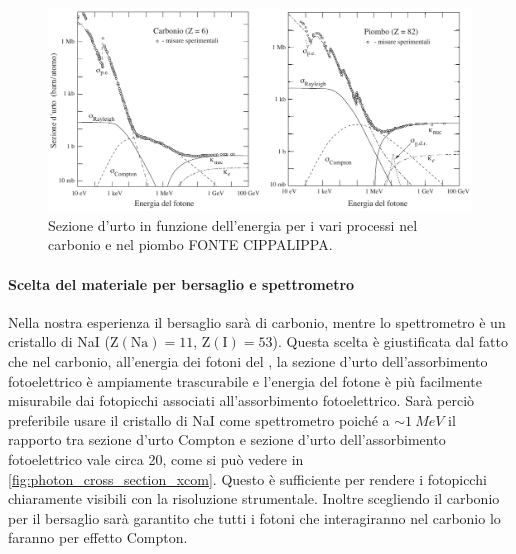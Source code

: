   \begin{figure}[h]
 	\centering
 	\includegraphics[width=\textwidth]{photon-matter-interaction}
 	\caption{\label{fig:photon_cross_section_pdg}Sezione d'urto in funzione dell'energia per i vari processi nel carbonio e nel piombo FONTE CIPPALIPPA.}
 \end{figure}

 \paragraph{Scelta del materiale per bersaglio e spettrometro}
 Nella nostra esperienza il bersaglio sarà di carbonio, mentre lo spettrometro è un cristallo di NaI ($\text{Z}(\text{Na})=11$, $\text{Z}(\text{I})=53$). Questa scelta è giustificata dal fatto che nel carbonio, all'energia dei fotoni del \co{}, la sezione d'urto dell'assorbimento fotoelettrico è ampiamente trascurabile e l'energia del fotone è più facilmente misurabile dai fotopicchi associati all'assorbimento fotoelettrico. Sarà perciò preferibile usare il cristallo di NaI come spettrometro poiché a $\sim\SI{1}{MeV}$ il rapporto tra sezione d'urto Compton e sezione d'urto dell'assorbimento fotoelettrico vale circa 20, come si può vedere in \autoref{fig:photon_cross_section_xcom}. Questo è sufficiente per rendere i fotopicchi chiaramente visibili con la risoluzione strumentale. Inoltre scegliendo il carbonio per il bersaglio  sarà garantito che tutti i fotoni che interagiranno nel carbonio lo faranno per effetto Compton.
  
